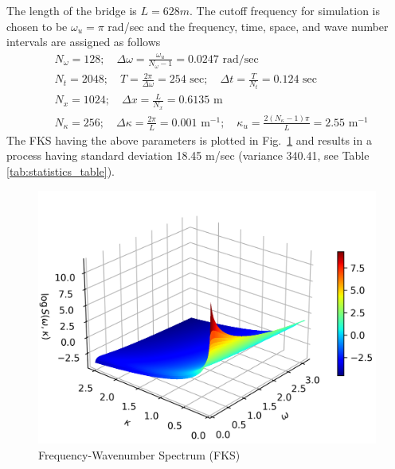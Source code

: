 \documentclass[preprint, review, 12pt]{elsarticle}
\begin{document}
The length of the bridge is $L=628m$. The cutoff frequency for simulation is chosen to be $\omega_u = \pi$ rad/sec and the frequency, time, space, and wave number intervals are assigned as follows
\begin{equation}
\begin{aligned}
    & N_\omega = 128; \quad \Delta \omega = \frac{\omega_u}{N_\omega - 1} = 0.0247 \text{ rad/sec} \\
    & N_t = 2048; \quad T = \frac{2\pi}{\Delta \omega} = 254 \text{ sec}; \quad \Delta t = \frac{T}{N_t} = 0.124 \text{ sec} \\
    & N_x = 1024; \quad \Delta x  = \frac{L}{N_x} = 0.6135 \text{ m} \\
    & N_\kappa = 256; \quad \Delta \kappa = \frac{2\pi}{L} = 0.001 \text{ m}^{-1}; \quad \kappa_u = \frac{2(N_\kappa - 1)\pi}{L} = 2.55 \text{ m}^{-1}
\end{aligned}
\end{equation}
The FKS having the above parameters is plotted in Fig.\ \ref{fig:FKS_spectrum} and results in a process having standard deviation 18.45 m/sec (variance 340.41, see Table \ref{tab:statistics_table}).
\begin{figure}[!ht]
    \centering
    \includegraphics{plots/frequency_wavenumber_power_spectrum.png}
    \caption{Frequency-Wavenumber Spectrum (FKS)}
    \label{fig:FKS_spectrum}
\end{figure}
\end{document}
